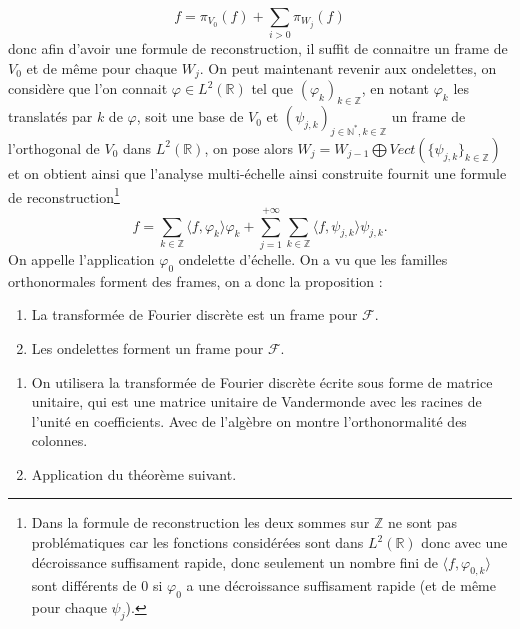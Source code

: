\begin{equation}
	f = \pi_{V_0}(f) +\sum_{i>0} \pi_{W_j}(f) 
\end{equation}
donc afin d'avoir une formule de reconstruction, il suffit de connaitre un frame de $V_0$ et de même pour chaque $W_j$. 
On peut maintenant revenir aux ondelettes, on considère que l'on connait $\varphi \in L^2(\mathbb{R})$ tel que $(\varphi_{k})_{k\in \mathbb{Z}}$, en notant $\varphi_k$ les translatés par $k$ de $\varphi$, soit une base de $V_0$ et $(\psi_{j,k})_{j\in \mathbb{N}^*, k \in \mathbb{Z}}$ un frame de l'orthogonal de $V_0$ dans $L^2(\mathbb{R})$, on pose alors $W_j = W_{j-1} \bigoplus Vect(\{\psi_{j,k}\}_{k\in \mathbb{Z}})$ et on obtient ainsi que l'analyse multi-échelle ainsi construite fournit une formule de reconstruction\footnote{Dans la formule de reconstruction les deux sommes sur $\mathbb{Z}$ ne sont pas problématiques car les fonctions considérées sont dans $L^2(\mathbb{R})$ donc avec une décroissance suffisament rapide, donc seulement un nombre fini de $\langle f, \varphi_{0,k} \rangle$ sont différents de 0 si $\varphi_0$ a une décroissance suffisament rapide (et de même pour chaque $\psi_j$).}
\begin{equation}
	f = \sum_{k\in \mathbb{Z}} \langle f, \varphi_{k} \rangle \varphi_{k} + \sum_{j = 1}^{+\infty} \sum_{k\in \mathbb{Z}} \langle f, \psi_{j,k} \rangle \psi_{j,k}.
\end{equation}
On appelle l'application $\varphi_0$ ondelette d'échelle.
On a vu que les familles orthonormales forment des frames, on a donc la proposition :
\begin{proposition}
	\begin{enumerate}
		\item La transformée de Fourier discrète est un frame pour $\mathcal{F}$.
		\item Les ondelettes forment un frame pour $\mathcal{F}$.
	\end{enumerate}
\end{proposition}
\begin{preuve}
	\begin{enumerate}
		\item On utilisera la transformée de Fourier discrète écrite sous forme de matrice unitaire, qui est une matrice unitaire de Vandermonde avec les racines de l'unité en coefficients. Avec de l'algèbre on montre l'orthonormalité des colonnes.
		\item Application du théorème suivant.
	\end{enumerate}
\end{preuve}

